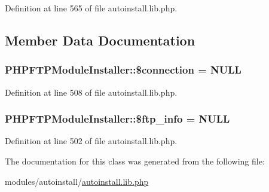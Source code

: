 Definition at line 565 of file autoinstall.\-lib.\-php.



\subsection{Member Data Documentation}
\hypertarget{classPHPFTPModuleInstaller_ab10c7e99865e2ba8ca058987dd81a986}{
\subsubsection[{\$connection}]{\setlength{\rightskip}{0pt plus 5cm}P\-H\-P\-F\-T\-P\-Module\-Installer\-::\$connection = N\-U\-L\-L}}\label{classPHPFTPModuleInstaller_ab10c7e99865e2ba8ca058987dd81a986}


Definition at line 508 of file autoinstall.\-lib.\-php.

\hypertarget{classPHPFTPModuleInstaller_abaa70235f6af643fc8d90fbecbc1892a}{
\subsubsection[{\$ftp\-\_\-info}]{\setlength{\rightskip}{0pt plus 5cm}P\-H\-P\-F\-T\-P\-Module\-Installer\-::\$ftp\-\_\-info = N\-U\-L\-L}}\label{classPHPFTPModuleInstaller_abaa70235f6af643fc8d90fbecbc1892a}


Definition at line 502 of file autoinstall.\-lib.\-php.



The documentation for this class was generated from the following file\-:\begin{DoxyCompactItemize}
\item 
modules/autoinstall/\hyperlink{autoinstall_8lib_8php}{autoinstall.\-lib.\-php}\end{DoxyCompactItemize}
